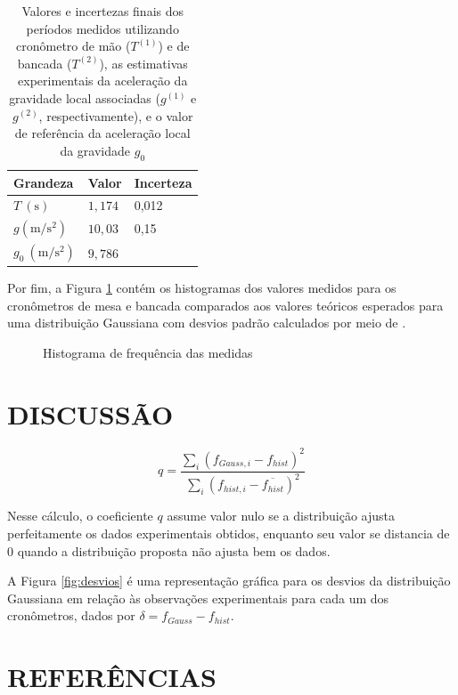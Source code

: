 \documentclass[12pt, a4paper, brazil]{article}
\begin{document}
\begin{table}[H]
	\centering
	\caption{Valores e incertezas finais dos períodos medidos utilizando cronômetro de mão ($T^{(1)}$) e de bancada ($T^{(2)}$), as estimativas experimentais da aceleração da gravidade local associadas ($g^{(1)}$ e $g^{(2)}$, respectivamente), e o valor de referência da aceleração local da gravidade $g_{0}$}
	\begin{tabular}{l l l}
		\hline
		Grandeza                    & Valor   & Incerteza \\[0.5ex]
		\hline
		$T\ \mathrm{(s)}$           & $1,174$ & 0,012     \\
		$g \mathrm{(m/s^{2})}$      & $10,03$ & 0,15      \\
		$g_{0}\ \mathrm{(m/s^{2})}$ & $9,786$ &           \\
		\hline
	\end{tabular}
	\label{tab:resultados}
\end{table}

Por fim, a Figura \ref{fig:histogramas} contém os histogramas dos valores medidos para os cronômetros de mesa e bancada comparados aos valores teóricos esperados para uma distribuição Gaussiana com desvios padrão calculados por meio de .

\begin{figure}[H]
	\centering
	\caption{Histograma de frequência das medidas}
	\label{fig:histogramas}

\end{figure}

\newpage
\section{DISCUSSÃO}

\begin{equation}\label{eq:comp}
	q = \frac{\sum_{i}(f_{Gauss,i}-{f_{hist}})^2}{\sum_{i}(f_{hist, i}-\overline{f_{hist}})^2}
\end{equation}

Nesse cálculo, o coeficiente $q$ assume valor nulo se a distribuição ajusta perfeitamente os dados experimentais obtidos, enquanto seu valor se distancia de $0$ quando a distribuição proposta não ajusta bem os dados.

A Figura \ref{fig:desvios} é uma representação gráfica para os desvios da distribuição Gaussiana em relação às observações experimentais para cada um dos cronômetros, dados por $\delta = f_{Gauss} - f_{hist}$.


\newpage

\clearpage
\renewcommand{\refname}{}
\section{REFERÊNCIAS}
\vspace{-1.5\baselineskip}

\end{document}
